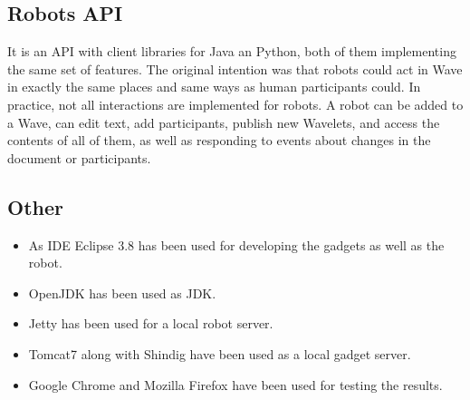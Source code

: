 \subsection{Robots API}
It is an API with client libraries for Java an Python, both of them implementing the same set of features. The original intention was that robots could act in Wave in exactly the same places and same ways as human participants could. In practice, not all interactions are implemented for robots. A robot can be added to a Wave, can edit text, add participants, publish new Wavelets, and access the contents of all of them, as well as responding to events about changes in the document or participants.

\subsection{Other}
\begin{itemize}
  \item As IDE Eclipse 3.8 has been used for developing the gadgets as well as the robot.
  \item OpenJDK has been used as JDK.
  \item Jetty has been used for a local robot server.
  \item Tomcat7 along with Shindig have been used as a local gadget server.
  \item Google Chrome and Mozilla Firefox have been used for testing the results.
\end{itemize}
